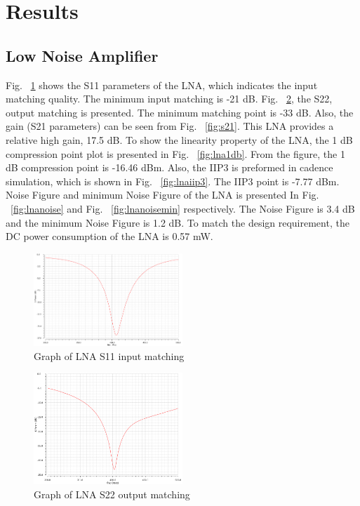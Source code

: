 \section{Results}
\subsection{Low Noise Amplifier}
Fig. ~\ref{fig:s11} shows the S11 parameters of the LNA, which indicates the input matching quality. The minimum input matching is -21 dB. Fig. ~\ref{fig:s22}, the S22, output matching is presented. The minimum matching point is -33 dB. Also, the gain (S21 parameters) can be seen from Fig. ~\ref{fig:s21}. This LNA provides a relative high gain, 17.5 dB. To show the linearity property of the LNA, the 1 dB compression point plot is presented in Fig. ~\ref{fig:lna1db}. From the figure, the 1 dB compression point is -16.46 dBm. Also, the IIP3 is preformed in cadence simulation, which is shown in Fig. ~\ref{fig:lnaiip3}. The IIP3 point is -7.77 dBm. Noise Figure and minimum Noise Figure of the LNA is presented In Fig. ~\ref{fig:lnanoise} and Fig. ~\ref{fig:lnanoisemin} respectively. The Noise Figure is 3.4 dB and the minimum Noise Figure is 1.2 dB. To match the design requirement, the DC power consumption of the LNA is 0.57 mW. 

\begin{figure}[h]
   \centering
    \includegraphics[width=0.5\textwidth]{figures/s11.png}
    \caption{Graph of LNA S11 input matching}
    \label{fig:s11}
\end{figure}

\begin{figure}[h]
   \centering
    \includegraphics[width=0.5\textwidth]{figures/s22.png}
    \caption{Graph of LNA S22 output matching}
    \label{fig:s22}
\end{figure}

